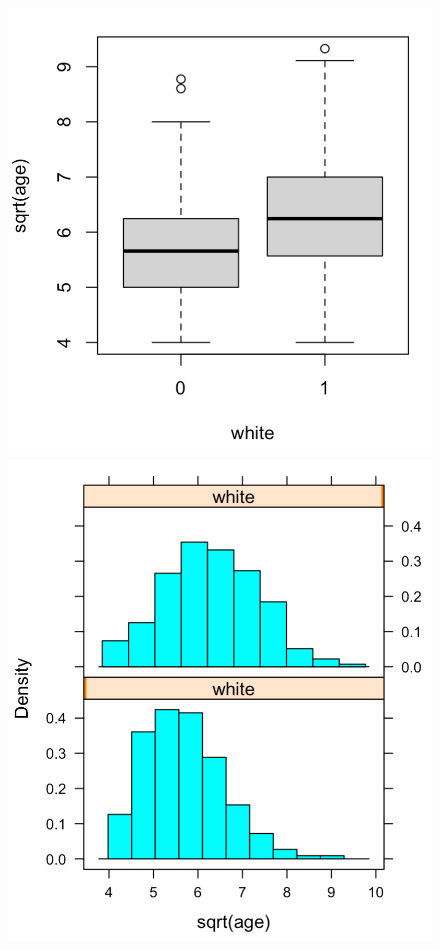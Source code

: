 \begin{figure}[h]
    \centering
    \includegraphics[scale=.4]{boxplot_sqrtage_white.png}
    \includegraphics[scale=.4]{histplot_sqrtage_white.png}

\end{figure}
